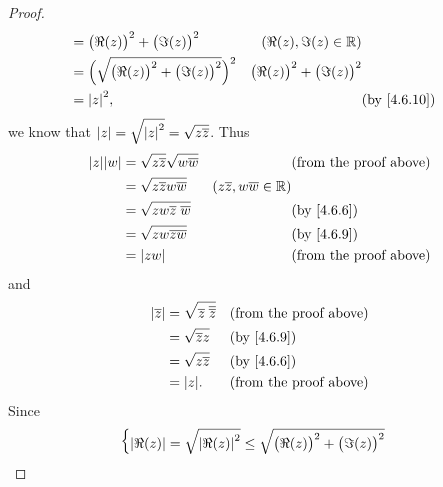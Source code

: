 \begin{proof}
\begin{align*}
                   & = \big(\Re(z)\big)^2 + \big(\Im(z)\big)^2                                                       & (\Re(z), \Im(z) \in \R)                                             \\
                   & = \Big(\sqrt{\big(\Re(z)\big)^2 + \big(\Im(z)\big)^2}\Big)^2                                    & \big(\Re(z)\big)^2 + \big(\Im(z)\big)^2                             \\
                   & = \abs{z}^2,                                                                                    &                                         & \text{(by \cref{4.6.10})}
  \end{align*}
  we know that \(\left\lvert z\right\rvert = \sqrt{\left\lvert z\right\rvert^2} = \sqrt{z \overline{z}}\).
  Thus
  \begin{align*}
    \abs{z} \abs{w} & = \sqrt{z \overline{z}} \sqrt{w \overline{w}} &                                         & \text{(from the proof above)} \\
                    & = \sqrt{z \overline{z} w \overline{w}}        & (z \overline{z}, w \overline{w} \in \R)                                 \\
                    & = \sqrt{zw \overline{z} \; \overline{w}}      &                                         & \by{4.6.6}                    \\
                    & = \sqrt{zw \overline{zw}}                     &                                         & \by{4.6.9}                    \\
                    & = \abs{zw}                                    &                                         & \text{(from the proof above)}
  \end{align*}
  and
  \begin{align*}
    \abs{\overline{z}} & = \sqrt{\overline{z} \; \overline{\overline{z}}} &  & \text{(from the proof above)} \\
                       & = \sqrt{\overline{z} z}                          &  & \by{4.6.9}                    \\
                       & = \sqrt{z \overline{z}}                          &  & \by{4.6.6}                    \\
                       & = \abs{z}.                                       &  & \text{(from the proof above)}
  \end{align*}
  Since
  \begin{align*}
             & \begin{dcases}
                 \abs{\Re(z)} = \sqrt{\abs{\Re(z)}^2} \leq \sqrt{\big(\Re(z)\big)^2 + \big(\Im(z)\big)^2} \\

\end{dcases}
\end{align*}
\end{proof}
